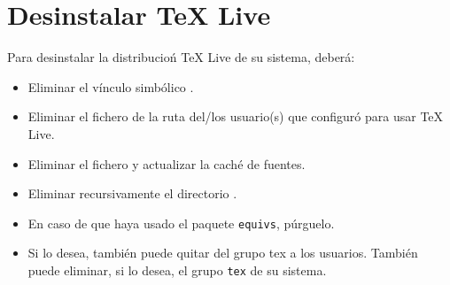 \section{Desinstalar \TeX{} Live}\label{sec:desinst}
Para desinstalar la distribucioń \TeX{} Live de su sistema, deberá:

\begin{itemize}
  \item Eliminar el vínculo simbólico .
  \item Eliminar el fichero  de la ruta del/los usuario(s) que configuró para usar \TeX{}
    Live.
  \item Eliminar el fichero  y actualizar la caché de fuentes.
  \item Eliminar recursivamente el directorio .
  \item En caso de que haya usado el paquete \lstinline+equivs+, púrguelo.
  \item Si lo desea, también puede quitar del grupo tex a los usuarios. También puede eliminar, si lo desea, el
    grupo \texttt{tex} de su sistema.
\end{itemize}
